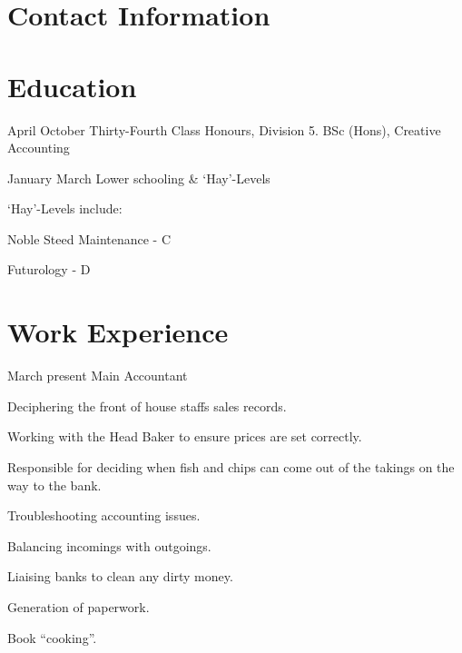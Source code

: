 \documentclass[10pt]{../bil-CV}
\begin{document}

\section{Contact Information}



\section{Education}
{April }{October }
{Thirty-Fourth Class Honours, Division 5.  BSc (Hons), Creative Accounting}\vspace{-2mm}

\subsectionrule

{January }{March }
{Lower schooling \& `Hay'-Levels}

`Hay'-Levels include:
\begin{compactlist}
	\item{Noble Steed Maintenance - C}
	\item{Futurology - D}
\end{compactlist}



\section{Work Experience}
{March }{present}
{Main Accountant}
\begin{compactlist}
	\item{Deciphering the front of house staffs sales records.}
	\item{Working with the Head Baker to ensure prices are set correctly.}
	\item{Responsible for deciding when fish and chips can come out of the takings on the way to the bank.}
	\item{Troubleshooting accounting issues.}
	\item{Balancing incomings with outgoings.}
	\item{Liaising banks to clean any dirty money.}
	\item{Generation of paperwork.}
	\item{Book ``cooking''.}
\end{compactlist}
\end{document}
